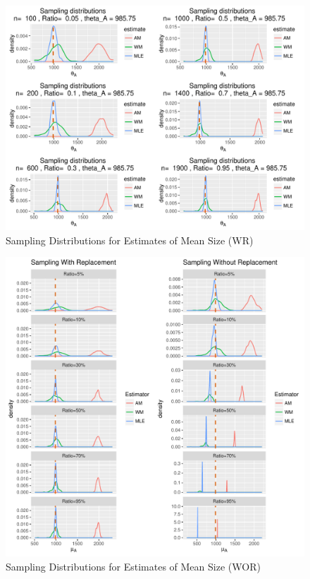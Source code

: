 \documentclass{article}\usepackage[]{graphicx}\usepackage[]{color}
\makeatletter
\def\maxwidth{ %
  \ifdim\Gin@nat@width>\linewidth
    \linewidth
  \else
    \Gin@nat@width
  \fi
}
\newenvironment{knitrout}{}{} %
\numberwithin{figure}{subsection} %
\numberwithin{table}{subsection} %
\makeatother
\begin{document}
\begin{figure}[!htbp]
  \centering
\begin{knitrout}
\color{fgcolor}
\includegraphics[width=\maxwidth]{figure/unnamed-chunk-1-1} 

\end{knitrout}
\caption{Sampling Distributions for Estimates of Mean Size (WR)}
  \label{fig_dis_size_wr}
\end{figure}




\begin{figure}[!htbp]
  \centering
\begin{knitrout}
\color{fgcolor}
\includegraphics[width=\maxwidth]{figure/unnamed-chunk-3-1} 

\end{knitrout}
\caption{Sampling Distributions for Estimates of Mean Size (WOR)}
  \label{fig_dis_size_wor}
\end{figure}
\end{document}
